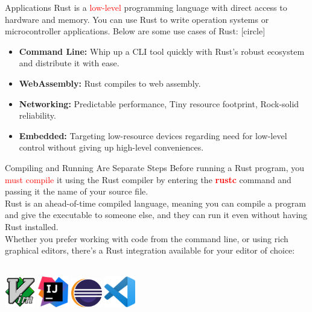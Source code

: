 \documentclass[10pt,xcolor={dvipsnames}, aspectratio=169]{beamer}
\begin{document}
	\begin{frame}{Applications}
		Rust is a \textcolor{red}{low-level} programming language with direct access to hardware and memory. You can use Rust to write operation systems or microcontroller applications. Below are some use cases of Rust:
	    [circle]
		\begin{itemize}
			\item \textbf{Command Line:} Whip up a CLI tool quickly with Rust’s robust ecosystem and distribute it with ease.
			\item \textbf{WebAssembly:} Rust compiles to web assembly.
			\item \textbf{Networking:} Predictable performance, Tiny resource footprint, Rock-solid reliability.
			\item \textbf{Embedded:} Targeting low-resource devices regarding need for low-level control without giving up high-level conveniences.
		\end{itemize}
	\end{frame}
	\begin{frame}{Compiling and Running Are Separate Steps}
		Before running a Rust program, you \textcolor{red}{must compile} it using the Rust compiler by entering the \textcolor{red}{\textbf{rustc}} command and passing it the name of your source file.
		~\\Rust is an ahead-of-time compiled language, meaning you can compile a program and give the executable to someone else, and they can run it even without having Rust installed.
		~\\Whether you prefer working with code from the command line, or using rich graphical editors, there’s a Rust integration available for your editor of choice:
		~\\~\\
		\begin{center}
		    \hspace{1cm}\includegraphics[width=0.1\textwidth]{Images/vim.png}
    		\hspace{1cm}\includegraphics[width=0.1\textwidth]{Images/intellij.png}
    		\hspace{1cm}\includegraphics[width=0.1\textwidth]{Images/eclipse.png}
    		\hspace{1cm}\includegraphics[width=0.1\textwidth]{Images/vscode.png}
		\end{center}
	\end{frame}
\end{document}
